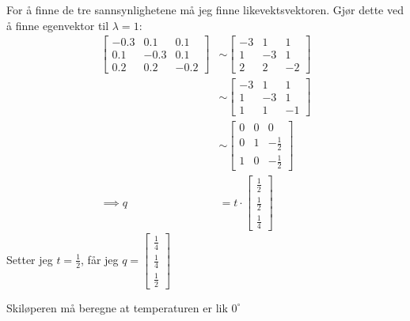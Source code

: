 \documentclass[11pt, a4paper, norsk]{NTNUoving}
\begin{document}
\begin{oppgave}
       For å finne de tre sannsynlighetene må jeg finne likevektsvektoren. Gjør dette ved å finne egenvektor til $\lambda = 1$:
       \begin{align*}
           \begin{bmatrix}
           -0.3 & 0.1 & 0.1 \\
           0.1 & -0.3 & 0.1 \\
           0.2 & 0.2 & -0.2
       \end{bmatrix} &\sim \begin{bmatrix}
       -3 & 1 & 1 \\
       1 & -3 & 1 \\
       2 & 2 & -2
       \end{bmatrix}
       \\
       &\sim \begin{bmatrix}
           -3 & 1 & 1 \\
           1 & -3 & 1 \\
           1 & 1 & -1
       \end{bmatrix}
       \\
       &\sim \begin{bmatrix}
           0 & 0 & 0 \\
           0 & 1 & -\frac{1}{2} \\
           1 & 0 & -\frac{1}{2}
       \end{bmatrix}
       \\
           \implies q &= t \cdot \begin{bmatrix}
               \frac{1}{2} \\
               \frac{1}{2} \\
               \frac{1}{4}
           \end{bmatrix}
       \end{align*}
       Setter jeg $t = \frac{1}{2}$, får jeg $q = \begin{bmatrix}
           \frac{1}{4} \\
           \frac{1}{4} \\
           \frac{1}{2}
       \end{bmatrix}$

       Skiløperen må beregne at temperaturen er lik $0^{\circ}$
   \end{oppgave}
\end{document}
